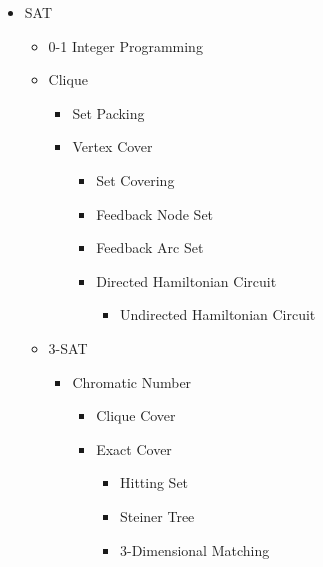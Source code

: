 
    \begin{itemize}
        \item SAT
        \begin{itemize}
            \item 0-1 Integer Programming
            \item Clique
            \begin{itemize}
                \item Set Packing
                \item Vertex Cover
                \begin{itemize}
                    \item Set Covering
                    \item Feedback Node Set
                    \item Feedback Arc Set
                    \item Directed Hamiltonian Circuit     
                    \begin{itemize}
                        \item Undirected Hamiltonian Circuit  
                    \end{itemize}
                \end{itemize}
            \end{itemize}
            \item 3-SAT
            \begin{itemize}
                \item Chromatic Number  
                \begin{itemize}
                    \item Clique Cover
                    \item Exact Cover
                    \begin{itemize}
                        \item Hitting Set
                        \item Steiner Tree
                        \item 3-Dimensional Matching

\end{itemize}
\end{itemize}
\end{itemize}
\end{itemize}
\end{itemize}
